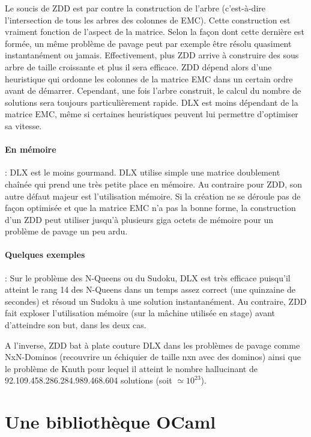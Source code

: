 \documentclass[a4paper]{article}
\begin{document}
Le soucis de ZDD est par contre la construction de l'arbre 
(c'est-à-dire l'intersection de tous les arbres des colonnes de EMC). 
Cette construction
est vraiment fonction de l'aspect de la matrice. Selon la façon dont cette 
dernière est formée, un même problème de pavage peut par exemple être 
résolu quasiment instantanément ou jamais. Effectivement, plus ZDD arrive à 
construire des sous arbre de taille croissante et plus il sera efficace.
ZDD dépend alors d'une heuristique
qui ordonne les colonnes de la matrice EMC dans un certain ordre 
avant de démarrer.
Cependant, une fois l'arbre construit, le calcul du nombre de solutions sera
toujours particulièrement rapide.
DLX est moins dépendant 
de la matrice EMC,
même si certaines heuristiques peuvent lui permettre d'optimiser sa vitesse.

\paragraph{En mémoire}

: DLX est le moins gourmand. DLX utilise simple une 
matrice doublement chaînée qui 
prend une très petite place en mémoire. Au contraire pour ZDD, son autre
défaut majeur est l'utilisation mémoire. Si la création ne se déroule 
pas de façon optimisée et que la matrice EMC n'a pas la bonne forme, 
la construction d'un ZDD peut 
utiliser jusqu'à plusieurs giga octets de mémoire pour un problème de pavage
un peu ardu. 

\paragraph{Quelques exemples}

: Sur le problème des N-Queens ou du Sudoku, DLX est très efficace 
puisqu'il atteint le rang 14 des N-Queens dans un temps assez correct 
(une quinzaine de secondes) et résoud un Sudoku à une solution instantanément. 
Au contraire, ZDD fait exploser l'utilisation
mémoire (sur la mâchine utilisée en stage) avant d'atteindre son but, dans les 
deux cas.

A l'inverse, ZDD bat à plate couture DLX dans les problèmes de pavage comme 
NxN-Dominos (recouvrire un échiquier de taille nxn avec des dominos) ainsi que
le problème de Knuth \cite[ex. 130, p252]{taocp4a} pour lequel il atteint le nombre 
hallucinant de 92.109.458.286.284.989.468.604 solutions (soit $\simeq 10^{23}$). 


\section{Une bibliothèque OCaml}
\end{document}
